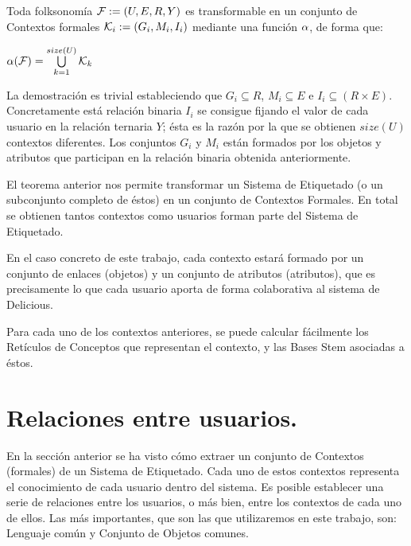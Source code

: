 \begin{teo}
Toda folksonomía ${\cal F} := (U,E,R,Y)$ es transformable en un conjunto de Contextos formales ${\cal K}_i := (G_i, M_i, I_i)$ mediante una función $\alpha$, de forma que:
\begin{center}
	$\alpha({\cal F}) = \bigcup \limits_{k=1}^{size(U)} {{\cal K}_{\mbox{\scriptsize \emph{k}}}}$
\end{center}

La demostración es trivial estableciendo que $G_i \subseteq R$, $M_i \subseteq E$ e $I_i \subseteq (R \times{E})$. Concretamente está relación binaria $I_i$ se consigue fijando el valor de cada usuario en la relación ternaria $Y$; ésta es la razón por la que se obtienen $size(U)$ contextos diferentes. Los conjuntos $G_i$ y $M_i$ están formados por los objetos y atributos que participan en la relación binaria obtenida anteriormente.
\end{teo}


El teorema anterior nos permite transformar un Sistema de Etiquetado (o un subconjunto completo de éstos) en un conjunto de Contextos Formales. En total se obtienen tantos contextos como usuarios forman parte del Sistema de Etiquetado.

En el caso concreto de este trabajo, cada contexto estará formado por un conjunto de enlaces (objetos) y un conjunto de atributos (atributos), que es precisamente lo que cada usuario aporta de forma colaborativa al sistema de Delicious.

Para cada uno de los contextos anteriores, se puede calcular fácilmente los Retículos de Conceptos que representan el contexto, y las Bases Stem asociadas a éstos.








\section{Relaciones entre usuarios.}

En la sección anterior se ha visto cómo extraer un conjunto de Contextos (formales) de un Sistema de Etiquetado. Cada uno de estos contextos representa el conocimiento de cada usuario dentro del sistema. Es posible establecer una serie de relaciones entre los usuarios, o más bien, entre los contextos de cada uno de ellos. Las más importantes, que son las que utilizaremos en este trabajo, son: Lenguaje común y Conjunto de Objetos comunes.

